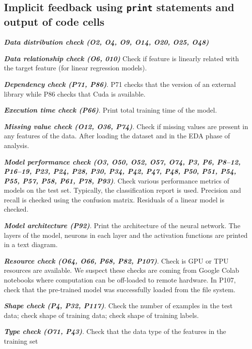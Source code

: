 \documentclass[sigconf]{acmart}
\begin{document}
\subsection{Implicit feedback using \texttt{print} statements and output of code cells}

\textbf{\emph{Data distribution check (O2, O4, O9, O14, O20, O25, O48)}}

\textbf{\emph{Data relationship check (O6, 010)}} Check if feature is linearly related with the target feature (for linear regression models).

\textbf{\emph{Dependency check (P71, P86)}}. P71 checks that the version of an external library while P86 checks that Cuda is available. 

\textbf{\emph{Execution time check (P66)}}. Print total training time of the model.

\textbf{\emph{Missing value check (O12, O36, P74)}}. Check if missing values are present in any features of the data. After loading the dataset and in the EDA phase of analysis.

\textbf{\emph{Model performance check (O3, O50, O52, O57, O74, P3, P6, P8--12, P16--19, P23, P24, P28, P30, P34, P42, P47, P48, P50, P51, P54, P55, P57, P58, P61, P78, P93)}}. Check various performance metrics of models on the test set. Typically, the classification report is used. Precision and recall is checked using the confusion matrix. Residuals of a linear model is checked.

\textbf{\emph{Model architecture (P92)}}. Print the architecture of the neural network. The layers of the model, neurons in each layer and the activation functions are printed in a text diagram.

\textbf{\emph{Resource check (O64, O66, P68, P82, P107)}}. Check is GPU or TPU resources are available. We suspect these checks are coming from Google Colab notebooks where computation can be off-loaded to remote hardware. In P107, check that the pre-trained model was successfully loaded from the file system.

\textbf{\emph{Shape check (P4, P32, P117)}}. Check the number of examples in the test data; check shape of training data; check shape of training labels.

\textbf{\emph{Type check (O71, P43)}}. Check that the data type of the features in the training set 
\end{document}

